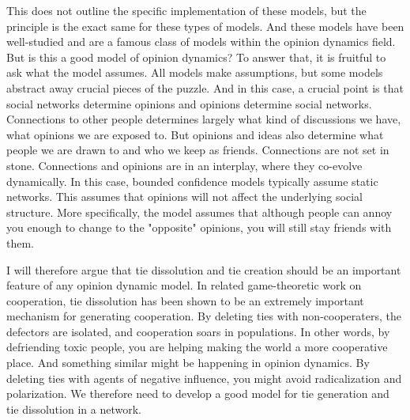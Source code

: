 \documentclass[9pt,twocolumn,twoside]{ilcss}
\begin{document}
This does not outline the specific implementation of these models, but the principle is the exact same for these types of models. 
And these models have been well-studied and are a famous class of models within the opinion dynamics field.
But is this a good model of opinion dynamics? 
To answer that, it is fruitful to ask what the model assumes. All models make assumptions, but some models abstract away crucial pieces of the puzzle.
And in this case, a crucial point is that social networks determine opinions and opinions determine social networks.
Connections to other people determines largely what kind of discussions we have, what opinions we are exposed to. 
But opinions and ideas also determine what people we are drawn to and who we keep as friends. Connections are not set in stone. Connections and opinions are in an interplay, where they co-evolve dynamically.
In this case, bounded confidence models typically assume static networks.
This assumes that opinions will not affect the underlying social structure. 
More specifically, the model assumes that although people can annoy you enough to change to the "opposite" opinions,
you will still stay friends with them. 

I will therefore argue that tie dissolution and tie creation should be an important feature of any opinion dynamic model.
In related game-theoretic work on cooperation, tie dissolution has been shown to be an extremely important mechanism for generating cooperation. 
By deleting ties with non-cooperaters, the defectors are isolated, and cooperation soars in populations. 
In other words, by defriending toxic people, you are helping making the world a more cooperative place. 
And something similar might be happening in opinion dynamics. By deleting ties with 
agents of negative influence, you might avoid radicalization and polarization.
We therefore need to develop a good model for tie generation and tie dissolution in a network. 
\end{document}
